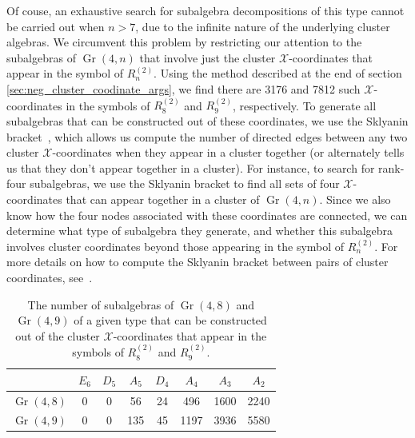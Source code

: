 \documentclass[11pt]{article}
\DeclareMathOperator{\Gr}{Gr}
\def\x{\mathcal{X}}
\begin{document}
Of couse, an exhaustive search for subalgebra decompositions of this type cannot be carried out when $n>7$, due to the infinite nature of the underlying cluster algebras. We circumvent this problem by restricting our attention to the subalgebras of $\Gr(4,n)$ that involve just the cluster $\x$-coordinates that appear in the symbol of $R_n^{(2)}$\!. Using the method described at the end of section \ref{sec:neg_cluster_coodinate_args}, we find there are 3176 and 7812 such $\x$-coordinates in the symbols of $R_8^{(2)}$\! and $R_9^{(2)}$\!, respectively. To generate all subalgebras that can be constructed out of these coordinates, we use the Sklyanin bracket~\cite{Sklyanin:1982tf,GSV}, which allows us compute the number of directed edges between any two cluster $\x$-coordinates when they appear in a cluster together (or alternately tells us that they don't appear together in a cluster). For instance, to search for rank-four subalgebras, we use the Sklyanin bracket to find all sets of four $\x$-coordinates that can appear together in a cluster of $\Gr(4,n)$. Since we also know how the four nodes associated with these coordinates are connected, we can determine what type of subalgebra they generate, and whether this subalgebra involves cluster coordinates beyond those appearing in the symbol of $R_n^{(2)}$\!. For more details on how to compute the Sklyanin bracket between pairs of cluster coordinates, see~\cite{Vergu:2015svm,Golden:2019kks}. 


\begin{table}
\begin{center}
\begin{tabular}{ c |  c | c | c | c | c | c | c }      
 \ & $E_6$ & $D_5$ & $A_5$ & $D_4$ & $A_4$ & $A_3$ & $A_2$  \\
\hline
$\Gr(4,8)$ & 0 & 0 & 56 & 24 & 496 & 1600 & 2240 \\ \hline
$\Gr(4,9)$ & 0  & 0 & 135 & 45 & 1197 & 3936 & 5580 
\end{tabular}
\end{center} 
\caption{The number of subalgebras of $\Gr(4,8)$ and $\Gr(4,9)$ of a given type that can be constructed out of the cluster $\x$-coordinates that appear in the symbols of $R_8^{(2)}$ and $R_9^{(2)}$.}
\label{table:subalgebra_counts}
\end{table}
\end{document}
